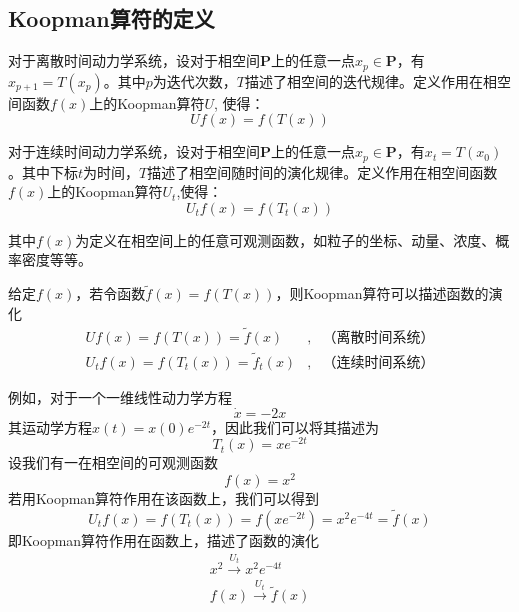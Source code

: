 \subsection{Koopman算符的定义}
对于离散时间动力学系统，设对于相空间$\mathbf{P}$上的任意一点$x_p\in \mathbf{P}$，有$x_{p+1}=T(x_p)$。其中$p$为迭代次数，$T$描述了相空间的迭代规律。定义作用在相空间函数$f(x)$上的Koopman算符$U$, 使得：
\begin{equation}
    Uf(x)=f(T(x))
\end{equation}

对于连续时间动力学系统，设对于相空间$\mathbf{P}$上的任意一点$x_p\in \mathbf{P}$，有$x_t=T(x_0)$。其中下标$t$为时间，$T$描述了相空间随时间的演化规律。定义作用在相空间函数$f(x)$上的Koopman算符$U_t$,使得：
\begin{equation}
    U_tf(x)=f(T_t(x))
\end{equation} 

其中$f(x)$为定义在相空间上的任意可观测函数，如粒子的坐标、动量、浓度、概率密度等等。

给定$f(x)$，若令函数$\tilde{f}(x)=f(T(x))$，则Koopman算符可以描述函数的演化
\begin{equation}
    \begin{aligned}
        Uf(x)=f(T(x))=\tilde{f}(x)       &,&\text{（离散时间系统）}\\
        U_tf(x)=f(T_t(x))=\tilde{f}_t(x) &,&\text{（连续时间系统）}
    \end{aligned}
\end{equation}

例如，对于一个一维线性动力学方程
\begin{equation}
    \dot{x}=-2x
\end{equation}
其运动学方程$x(t)=x(0)e^{-2t}$，因此我们可以将其描述为
\begin{equation}
    T_t(x)=xe^{-2t}
\end{equation}
设我们有一在相空间的可观测函数
\begin{equation}
    f(x)=x^2
\end{equation}
若用Koopman算符作用在该函数上，我们可以得到
\begin{equation}
    U_tf(x)=f(T_t(x))=f(xe^{-2t})=x^2e^{-4t}=\tilde{f}(x)
\end{equation}
即Koopman算符作用在函数上，描述了函数的演化
\begin{equation}
    \begin{aligned}
        x^2 \stackrel{U_t}{\longrightarrow} x^2e^{-4t} \\
        f(x) \stackrel{U_t}{\longrightarrow} \tilde{f}(x)
    \end{aligned}
\end{equation}


